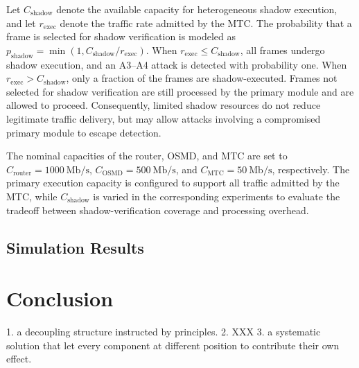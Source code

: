 \documentclass[journal]{IEEEtran}
\begin{document}
Let $C_{\mathrm{shadow}}$ denote the available capacity for heterogeneous shadow execution, and let $r_{\mathrm{exec}}$ denote the traffic rate admitted by the MTC. The probability that a frame is selected for shadow verification is modeled as $p_{\mathrm{shadow}}=\min(1,C_{\mathrm{shadow}}/r_{\mathrm{exec}})$. When $r_{\mathrm{exec}}\leq C_{\mathrm{shadow}}$, all frames undergo shadow execution, and an A3--A4 attack is detected with probability one. When $r_{\mathrm{exec}}>C_{\mathrm{shadow}}$, only a fraction of the frames are shadow-executed. Frames not selected for shadow verification are still processed by the primary module and are allowed to proceed. Consequently, limited shadow resources do not reduce legitimate traffic delivery, but may allow attacks involving a compromised primary module to escape detection.

The nominal capacities of the router, OSMD, and MTC are set to $C_{\mathrm{router}}=1000~\mathrm{Mb/s}$, $C_{\mathrm{OSMD}}=500~\mathrm{Mb/s}$, and $C_{\mathrm{MTC}}=50~\mathrm{Mb/s}$, respectively. The primary execution capacity is configured to support all traffic admitted by the MTC, while $C_{\mathrm{shadow}}$ is varied in the corresponding experiments to evaluate the tradeoff between shadow-verification coverage and processing overhead.



\subsection{Simulation Results}





\section{Conclusion}
\label{sec:conclusion}

1. a decoupling structure instructed by principles. 
2. XXX
3. a systematic solution that let every component at different position to contribute their own effect. 






\end{document}
